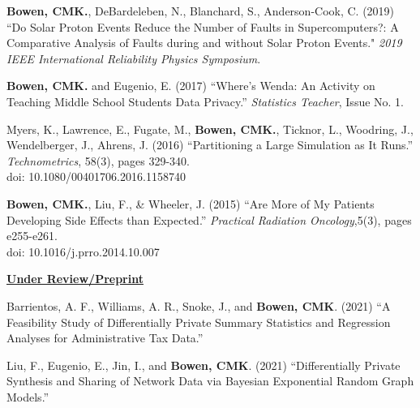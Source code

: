 \documentclass[11pt, letterpaper, roman]{moderncv} %
\begin{document}
\begin{etaremune}[topsep=0pt, itemsep=4pt, partopsep=0pt, parsep=0pt]
    \item \textbf{Bowen, CMK.}, DeBardeleben, N., Blanchard, S., Anderson-Cook, C. (2019) ``Do Solar Proton Events Reduce the Number of Faults in Supercomputers?: A Comparative Analysis of Faults during and without Solar Proton Events." \textit{2019 IEEE International Reliability Physics Symposium}.

    \item \textbf{Bowen, CMK.} and Eugenio, E. (2017) ``Where's Wenda:  An Activity on Teaching Middle School Students Data Privacy.'' \textit{Statistics Teacher}, Issue No. 1.
    
    \item Myers, K., Lawrence, E., Fugate, M., \textbf{Bowen, CMK.}, Ticknor, L., Woodring, J., Wendelberger, J., Ahrens, J. (2016) ``Partitioning a Large Simulation as It Runs.'' \textit{Technometrics}, 58(3), pages 329-340. \\
    doi: 10.1080/00401706.2016.1158740

    \item \textbf{Bowen, CMK.}, Liu, F., \& Wheeler, J. (2015) ``Are More of My Patients Developing Side Effects than Expected.'' \textit{Practical Radiation Oncology},5(3), pages e255-e261.\\
    doi: 10.1016/j.prro.2014.10.007
\end{etaremune}

\newpage
\noindent\underline{\textbf{Under Review/Preprint}}
\begin{etaremune}[topsep=0pt, itemsep=4pt, partopsep=0pt, parsep=0pt]
    \item Barrientos, A. F., Williams, A. R., Snoke, J., and \textbf{Bowen, CMK}. (2021) ``A Feasibility Study of Differentially Private Summary Statistics and Regression Analyses for Administrative Tax Data.''
    
    \item Liu, F., Eugenio, E., Jin, I., and \textbf{Bowen, CMK}. (2021) ``Differentially Private Synthesis and Sharing of Network Data via Bayesian Exponential Random Graph Models.''
\end{etaremune}
\end{document}
